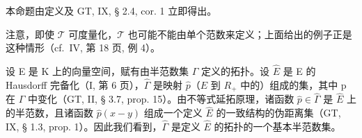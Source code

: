本命题由定义及 GT, IX, § 2.4, cor. 1 立即得出。

注意，即使 \(\mathcal{T}\) 可度量化，\(\mathcal{T}\) 也可能不能由单个范数来定义；上面给出的例子正是这种情形（cf.~IV, 第 18 页, 例 4）。

设 E 是 K 上的向量空间，赋有由半范数集 \(\Gamma\) 定义的拓扑。设 \(\hat{E}\) 是 E 的 Hausdorff 完备化（I, 第 6 页），\(\hat{\Gamma}\) 是映射 \(\hat{p}\)（\(\hat{E}\) 到 \(R_{+}\) 中的）组成的集，其中 p 在 \(\Gamma\) 中变化（GT, II, § 3.7, prop. 15）。由不等式延拓原理，诸函数 \(\hat{p} \in \hat{\Gamma}\) 是 \(\hat{E}\) 上的半范数，且诸函数 \(\hat{p}(x - y)\) 组成一个定义 \(\hat{E}\) 的一致结构的伪距离集（GT, IX, § 1.3, prop. 1）。因此我们看到，\(\hat{\Gamma}\) 是定义 \(\hat{E}\) 的拓扑的一个基本半范数集。

